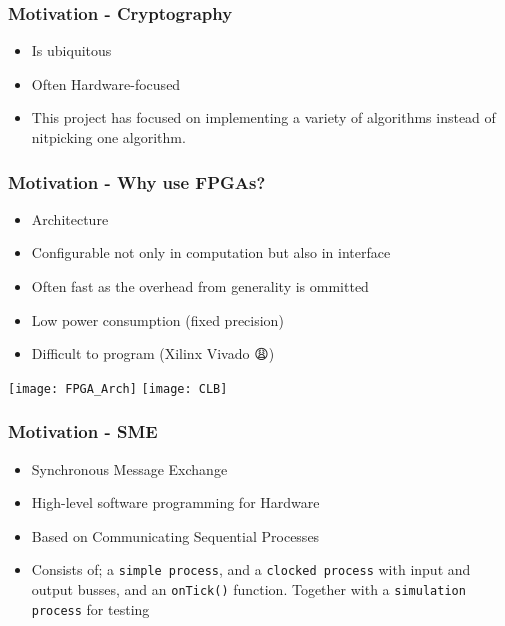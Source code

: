 \begin{frame}
  \frametitle{Motivation - Cryptography}
  \begin{itemize}
  \item Is ubiquitous
  \item Often Hardware-focused
  \item This project has focused on implementing a variety of algorithms instead of nitpicking one algorithm.
  \end{itemize}
\end{frame}

\begin{frame}
  \frametitle{Motivation - Why use FPGAs?}
  \begin{minipage}[b]{0.45\textwidth}
    \begin{itemize}
    \item Architecture
    \item Configurable not only in computation but also in interface
    \item Often fast as the overhead from generality is ommitted
    \item Low power consumption (fixed precision)
    \item Difficult to program (Xilinx Vivado {\DejaSans 😩})
    \end{itemize}
  \end{minipage}
  \vspace{30px}
  \begin{minipage}[b]{0.50\textwidth}
    \texttt{[image: FPGA\_Arch]}
    \texttt{[image: CLB]}
  \end{minipage}
\end{frame}

\begin{frame}
  \frametitle{Motivation - SME}
  \begin{itemize}
  \item Synchronous Message Exchange
  \item High-level software programming for Hardware
  \item Based on Communicating Sequential Processes
  \item Consists of; a \verb~simple process~, and a \verb~clocked process~ with input and output busses, and an \verb~onTick()~ function. Together with a \verb~simulation process~ for testing
  \end{itemize}
\end{frame}
